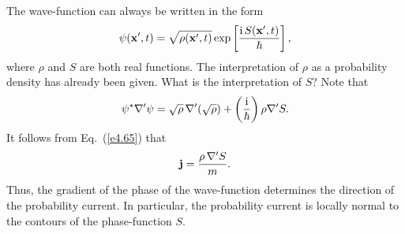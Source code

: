 The wave-function can always be written in the form
\begin{equation}\label{e4.70}
\psi({\bf x}', t) = \sqrt{\rho({\bf x}', t)} \exp\left[\frac{{\rm i}\,S({\bf x}',t)}{
\hbar}\right],
\end{equation}
where 
$\rho$ and $S$ are both real functions. The interpretation of $\rho$ as a probability
density has already been given. What is the interpretation of $S$?
Note that
\begin{equation}
\psi^\ast \nabla'\psi = \sqrt{\rho} \,\nabla'(\sqrt{\rho}) + \left(\frac{{\rm i}}
{\hbar}
\right) \rho \nabla' S.
\end{equation}
It follows from Eq.~(\ref{e4.65}) that
\begin{equation}
{\bf j} = \frac{\rho \,\nabla' S}{m}.
\end{equation}
Thus, the gradient of the phase of the wave-function determines the 
direction of the probability
current. In particular, the probability current is locally
normal to the  contours of the  phase-function $S$. 

